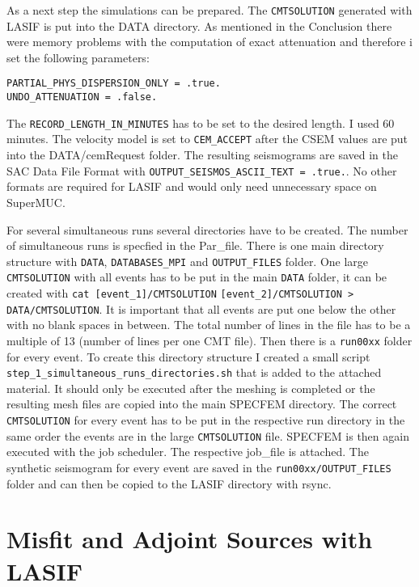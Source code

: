 As a next step the simulations can be prepared. 
The \texttt{CMTSOLUTION} generated with LASIF is put into the DATA directory.
As mentioned in the Conclusion there were memory problems with the 
computation of exact attenuation and therefore i set the following parameters:
\begin{lstlisting} 
PARTIAL_PHYS_DISPERSION_ONLY = .true.
UNDO_ATTENUATION = .false.
\end{lstlisting}

The \texttt{RECORD\_LENGTH\_IN\_MINUTES} has to be set to the desired length. 
I used 60 minutes. 
The velocity model is set to \texttt{CEM\_ACCEPT} after the CSEM values are 
put into the DATA/cemRequest folder.
The resulting seismograms are saved in the SAC Data File Format
with \texttt{OUTPUT\_SEISMOS\_ASCII\_TEXT = .true.}. 
No other formats are required for LASIF and would only need unnecessary 
space on SuperMUC.

For several simultaneous runs several directories have to be created.
The number of simultaneous runs is specfied in the Par\_file.
There is one main directory structure with \texttt{DATA}, \texttt{DATABASES\_MPI}
and \texttt{OUTPUT\_FILES} folder.
One large \texttt{CMTSOLUTION} with all events has to be put in the main 
\texttt{DATA} folder, it can be created with \texttt{cat [event\_1]/CMTSOLUTION}
\texttt{[event\_2]/CMTSOLUTION > DATA/CMTSOLUTION}.
It is important that all events are put one below the other with no 
blank spaces in between. 
The total number of lines in the file has to be a multiple of 13 
(number of lines per one CMT file).
Then there is a \texttt{run00xx} folder for every event.
To create this directory structure I created a small script \texttt{step\_1\_simultaneous\_runs\_directories.sh} that is added to 
the attached material. 
It should only be executed after the meshing is completed or the 
resulting mesh files are copied into the main SPECFEM directory.
The correct \texttt{CMTSOLUTION} for every event has to be put in the 
respective run directory in the same order the events are in the large
\texttt{CMTSOLUTION} file.
SPECFEM is then again executed with the job scheduler. 
The respective job\_file is attached.
The synthetic seismogram for every event are saved in the 
\texttt{run00xx/OUTPUT\_FILES} folder and can then be copied to the 
LASIF directory with rsync.



\section{Misfit and Adjoint Sources with LASIF}

